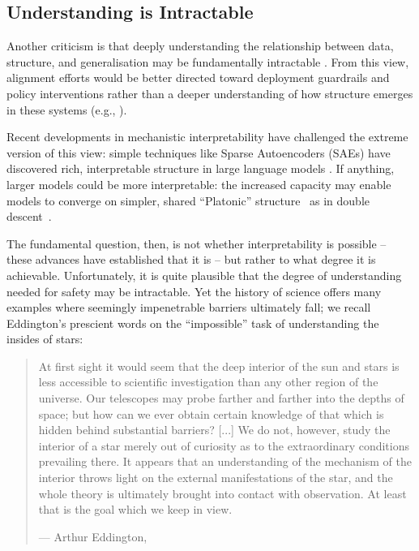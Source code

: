 \subsection{Understanding is Intractable}
Another criticism is that deeply understanding the relationship between data, structure, and generalisation may be fundamentally intractable \citep{hendrycks2025introduction,yampolskiy2020unexplainability}. %
From this view, alignment efforts would be better directed toward deployment guardrails and policy interventions rather than a deeper understanding of how structure emerges in these systems (e.g., \citealt{greenblatt2024ai}).

Recent developments in mechanistic interpretability have challenged the extreme version of this view: simple techniques like Sparse Autoencoders (SAEs) have discovered rich, interpretable structure in large language models  \citep{templeton2024scaling}. If anything, larger models could be more interpretable: the increased capacity may enable models to converge on simpler, shared ``Platonic'' structure~\citep{huh2024platonic} as in double descent~\citep{nakkiran2021deep, belkin2020two}. 

The fundamental question, then, is not whether interpretability is possible -- these advances have established that it is -- but rather to what degree it is achievable. Unfortunately, it is quite plausible that the degree of understanding needed for safety may be intractable. Yet the history of science offers many examples where seemingly impenetrable barriers ultimately fall; we recall Eddington's prescient words on the ``impossible'' task of understanding the insides of stars:


\begin{quote}At first sight it would seem that the deep interior of the sun and stars is less accessible to scientific investigation than any other region of the universe. Our telescopes may probe farther and farther into the depths of space; but how can we ever obtain certain knowledge of that which is hidden behind substantial barriers? %
[...]
We do not, however, study the interior of a star merely out of curiosity as to the extraordinary conditions prevailing there. It appears that an understanding of the mechanism of the interior throws light on the external manifestations of the star, and the whole theory is ultimately brought into contact with observation. At least that is the goal which we keep in view.
\begin{flushright}
--- Arthur Eddington, \citeyear{eddington1988internal}
\end{flushright}
\end{quote}




